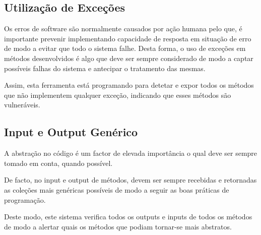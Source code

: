 \subsection{Utilização de Exceções}

\hspace{5mm} Os erros de software são normalmente causados por ação humana pelo que, é importante prevenir implementando capacidade de resposta em situação de erro de modo a evitar que todo o sistema falhe. Desta forma, o uso de exceções em métodos desenvolvidos é algo que deve ser sempre considerado de modo a captar possíveis falhas do sistema e antecipar o tratamento das mesmas. 
\par Assim, esta ferramenta está programando para detetar e expor todos os métodos que não implementem qualquer exceção, indicando que esses métodos são vulneráveis.

\subsection{Input e Output Genérico}

\hspace{5mm} A abstração no código é um factor de elevada importância o qual deve ser sempre tomado em conta, quando possível.
\par De facto, no input e output de métodos, devem ser sempre recebidas e retornadas as coleções mais genéricas possíveis de modo a seguir as boas práticas de programação. 
\par Deste modo, este sistema verifica todos os outputs e inputs de todos os métodos de modo a alertar quais os métodos que podiam tornar-se mais abstratos.

